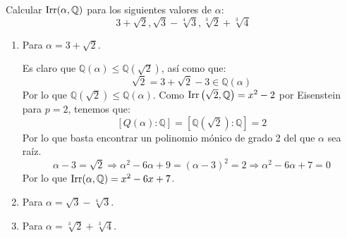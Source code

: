 \begin{ejercicio}
    Calcular $\operatorname{Irr}(\alpha,\mathbb{Q})$ para los siguientes valores de $\alpha$:
    \begin{equation*}
        3+\sqrt{2}, \sqrt{3}-\sqrt[4]{3}, \sqrt[3]{2}+\sqrt[3]{4}
    \end{equation*}

    \begin{enumerate}[label=\alph*)]
        \item Para $\alpha=3+\sqrt{2}$.

            Es claro que $\mathbb{Q}(\alpha)\leq \mathbb{Q}\left(\sqrt{2}\right)$, así como que:
            \begin{equation*}
                \sqrt{2} = 3+\sqrt{2}-3 \in \mathbb{Q}(\alpha)
            \end{equation*}
            Por lo que $\mathbb{Q}\left(\sqrt{2}\right)\leq \mathbb{Q}(\alpha)$. Como $\operatorname{Irr}\left(\sqrt{2},\mathbb{Q}\right) = x^2-2$ por Eisenstein para $p=2$, tenemos que:
            \begin{equation*}
                \left[Q(\alpha):\mathbb{Q}\right] = \left[\mathbb{Q}\left(\sqrt{2}\right):\mathbb{Q}\right] = 2
            \end{equation*}
            Por lo que basta encontrar un polinomio mónico de grado 2 del que $\alpha$ sea raíz.
            \begin{equation*}
                \alpha -3 = \sqrt{2} \Longrightarrow \alpha^2 -6\alpha +9 = {(\alpha-3)}^{2}=2 \Longrightarrow \alpha^2 -6\alpha +7 = 0
            \end{equation*}
            Por lo que $\operatorname{Irr}(\alpha,\mathbb{Q}) = x^2-6x+7$.
        \item Para $\alpha = \sqrt{3}-\sqrt[4]{3}$. %
        \item Para $\alpha = \sqrt[3]{2}+\sqrt[3]{4}$. %
    \end{enumerate}
\end{ejercicio}

